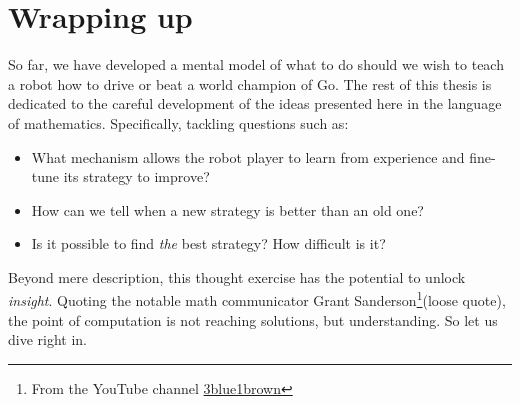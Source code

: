 \section{Wrapping up}
So far, we have developed a mental model of what to do should we wish to teach a
robot how to drive or beat a world champion of Go. The rest of this thesis is
dedicated to the careful development of the ideas presented here in the language
of mathematics. Specifically, tackling questions such as:
\begin{itemize}
	\item What mechanism allows the robot player to learn from experience and
		fine-tune its strategy to improve?
	\item How can we tell when a new strategy is better than an old one?
	\item Is it possible to find \textit{the} best strategy?  How difficult is
		it?
\end{itemize}

Beyond mere description, this thought exercise has the potential to unlock
\textit{insight}. Quoting the notable math communicator Grant
Sanderson\footnote{From the YouTube channel
\href{https://www.youtube.com/channel/UCYO_jab_esuFRV4b17AJtAw}{3blue1brown}}(loose
quote), the point of computation is not reaching solutions, but understanding.
So let us dive right in.